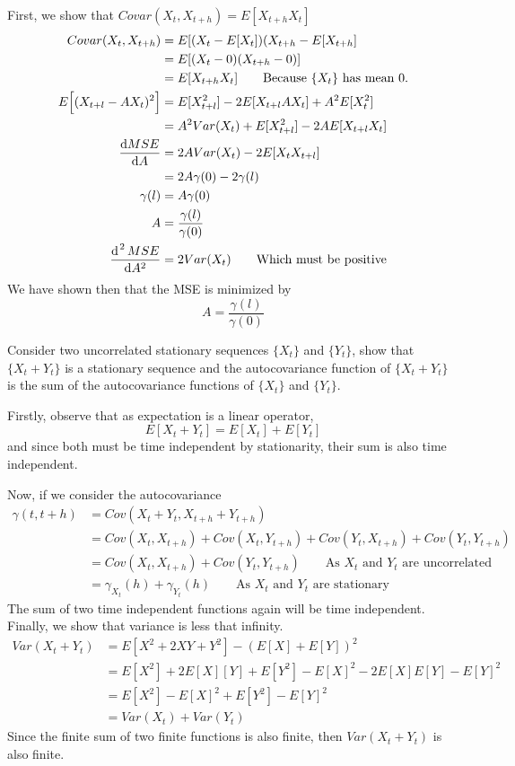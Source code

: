 \documentclass[10pt,a4paper]{exam}
\begin{document}
\begin{questions}
\begin{solution}
First, we show that $Covar(X_t, X_{t+h}) = E[X_{t+h}X_t]$
\begin{align*}
Covar(X_t, X_{t+h})		&= E[(X_t - E[X_t])(X_{t+h} - E[X_{t+h}]\\
									&= E[(X_t - 0)(X_{t+h} - 0)]\\
									&= E[X_{t+h}X_t]	\quad \quad \text{Because }\{X_t\}\text{ has mean 0}.\\
E\Big[(X_{t+l} - AX_t)^2\Big] &= E[X_{t+l}^2] - 2E[X_{t+l}AX_t] + A^2E[X_t^2]\\
											&= A^2Var(X_t) + E[X_{t+l}^2] - 2AE[X_{t+l}X_t]\\
\frac{\dif MSE}{\dif A}			&= 2AVar(X_t) - 2E[X_tX_{t+l}]\\
											&= 2A\gamma(0) - 2\gamma(l)\\
						\gamma(l)		&= A\gamma(0)\\
						A					&= \frac{\gamma(l)}{\gamma(0)}\\
\frac{\dif^{\text{ } 2} MSE}{\dif A^2}		&= 2Var(X_t) \quad \quad \text{Which must be positive}
\end{align*}
We have shown then that the MSE is minimized by $$A = \frac{\gamma(l)}{\gamma(0)}$$
\end{solution}
\pagebreak
\question Consider two uncorrelated stationary sequences $\{X_t\}$ and $\{Y_t\}$, show that $\{X_t + Y_t\}$ is a stationary sequence and the autocovariance function of $\{X_t + Y_t\}$ is the sum of the autocovariance functions of $\{X_t\}$ and $\{Y_t\}$.

\begin{solution}
Firstly, observe that as expectation is a linear operator,
$$E[X_t + Y_t] = E[X_t] + E[Y_t]$$
and since both must be time independent by stationarity, their sum is also time independent.

Now, if we consider the autocovariance
\begin{align*}
\gamma(t, t+h)	&= Cov(X_t + Y_t, X_{t+h} + Y_{t+h})\\
						&= Cov(X_t, X_{t+h}) + Cov(X_t, Y_{t+h}) + Cov(Y_t, X_{t+h}) + Cov(Y_t, Y_{t+h})\\
						&= Cov(X_t, X_{t+h}) + Cov(Y_t, Y_{t+h}) \quad \quad \text{As }X_t\text{ and }Y_t\text{ are uncorrelated}\\
						&= \gamma_{X_t}(h) + \gamma_{Y_t}(h) \quad \quad \text{As }X_t\text{ and }Y_t\text{ are stationary}
\end{align*}
The sum of two time independent functions again will be time independent. Finally, we show that variance is less that infinity.
\begin{align*}
Var(X_t + Y_t) 	&= E[X^2 + 2XY + Y^2] - (E[X] + E[Y])^2\\
						&= E[X^2] + 2E[X][Y] + E[Y^2] - E[X]^2 - 2E[X]E[Y] - E[Y]^2\\
						&= E[X^2] - E[X]^2 + E[Y^2] - E[Y]^2\\
						&= Var(X_t) + Var(Y_t)
\end{align*}
Since the finite sum of two finite functions is also finite, then $Var(X_t + Y_t)$ is also finite.


\end{solution}
\end{questions}
\end{document}
